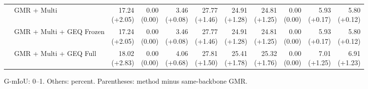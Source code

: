 \documentclass{article}
\begin{document}
{\begin{tabular}{llrrrrrrrrr}
 & GMR + Multi & \shortstack{17.24 \\ {\scriptsize\textcolor{Gain}{(+2.05)}}} & \shortstack{0.00 \\ {\scriptsize\textcolor{Zero}{(0.00)}}} & \shortstack{3.46 \\ {\scriptsize\textcolor{Gain}{(+0.08)}}} & \shortstack{27.77 \\ {\scriptsize\textcolor{Gain}{(+1.46)}}} & \shortstack{24.91 \\ {\scriptsize\textcolor{Gain}{(+1.28)}}} & \shortstack{24.81 \\ {\scriptsize\textcolor{Gain}{(+1.25)}}} & \shortstack{0.00 \\ {\scriptsize\textcolor{Zero}{(0.00)}}} & \shortstack{5.93 \\ {\scriptsize\textcolor{Gain}{(+0.17)}}} & \shortstack{5.80 \\ {\scriptsize\textcolor{Gain}{(+0.12)}}} \\
 & GMR + Multi + GEQ Frozen & \shortstack{17.24 \\ {\scriptsize\textcolor{Gain}{(+2.05)}}} & \shortstack{0.00 \\ {\scriptsize\textcolor{Zero}{(0.00)}}} & \shortstack{3.46 \\ {\scriptsize\textcolor{Gain}{(+0.08)}}} & \shortstack{27.77 \\ {\scriptsize\textcolor{Gain}{(+1.46)}}} & \shortstack{24.91 \\ {\scriptsize\textcolor{Gain}{(+1.28)}}} & \shortstack{24.81 \\ {\scriptsize\textcolor{Gain}{(+1.25)}}} & \shortstack{0.00 \\ {\scriptsize\textcolor{Zero}{(0.00)}}} & \shortstack{5.93 \\ {\scriptsize\textcolor{Gain}{(+0.17)}}} & \shortstack{5.80 \\ {\scriptsize\textcolor{Gain}{(+0.12)}}} \\
 & GMR + Multi + GEQ Full & \shortstack{18.02 \\ {\scriptsize\textcolor{Gain}{(+2.83)}}} & \shortstack{0.00 \\ {\scriptsize\textcolor{Zero}{(0.00)}}} & \shortstack{4.06 \\ {\scriptsize\textcolor{Gain}{(+0.68)}}} & \shortstack{27.81 \\ {\scriptsize\textcolor{Gain}{(+1.50)}}} & \shortstack{25.41 \\ {\scriptsize\textcolor{Gain}{(+1.78)}}} & \shortstack{25.32 \\ {\scriptsize\textcolor{Gain}{(+1.76)}}} & \shortstack{0.00 \\ {\scriptsize\textcolor{Zero}{(0.00)}}} & \shortstack{7.01 \\ {\scriptsize\textcolor{Gain}{(+1.25)}}} & \shortstack{6.91 \\ {\scriptsize\textcolor{Gain}{(+1.23)}}} \\
\bottomrule\end{tabular}}\par
G-mIoU: 0--1. Others: percent. Parentheses: method minus same-backbone GMR.\par
\end{document}
